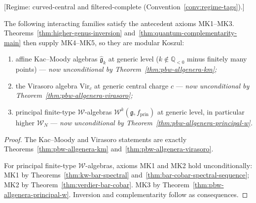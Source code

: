 \begin{proposition}
\label{prop:conditional-modular-koszul}
\textup{[Regime: curved-central and filtered-complete
\textup{(}Convention~\textup{\ref{conv:regime-tags})}.]}

The following interacting families satisfy the antecedent axioms
\textup{MK1--MK3}.
Theorems~\textup{\ref{thm:higher-genus-inversion}}
and~\textup{\ref{thm:quantum-complementarity-main}}
then supply \textup{MK4--MK5}, so they are modular Koszul:
\begin{enumerate}[label=\textup{(\alph*)},start=3]
\item affine Kac--Moody algebras $\widehat{\mathfrak{g}}_k$ at generic
  level \textup{(}$k \notin \mathbb{Q}_{< 0}$ minus finitely many
  points\textup{)} --- \emph{now unconditional by
  Theorem~\textup{\ref{thm:pbw-allgenera-km}};}
\item the Virasoro algebra $\mathrm{Vir}_c$ at generic central charge
  $c$ --- \emph{now unconditional by
  Theorem~\textup{\ref{thm:pbw-allgenera-virasoro}};}
\item principal finite-type $\mathcal{W}$-algebras
  $\mathcal{W}^k(\mathfrak{g}, f_{\mathrm{prin}})$ at generic level,
  in particular higher $\mathcal{W}_N$
  --- \emph{now unconditional by
  Theorem~\textup{\ref{thm:pbw-allgenera-principal-w}}.}
\end{enumerate}
\end{proposition}

\begin{proof}
The Kac--Moody and Virasoro statements are exactly
Theorems~\ref{thm:pbw-allgenera-km}
and~\ref{thm:pbw-allgenera-virasoro}.

For principal finite-type $\mathcal{W}$-algebras, axioms MK1 and MK2 hold
unconditionally:
MK1 by
Theorems~\ref{thm:kw-bar-spectral} and~\ref{thm:bar-cobar-spectral-sequence};
MK2 by Theorem~\ref{thm:verdier-bar-cobar}.
MK3 by Theorem~\ref{thm:pbw-allgenera-principal-w}.
Inversion and complementarity follow as consequences.
\end{proof}

